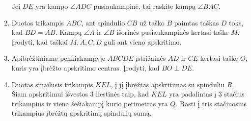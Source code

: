 \begin{enumerate}
  Jei $DE$ yra kampo $\angle ADC$ pusiaukampinė, tai raskite
  kampą $\angle BAC$. 
\item Duotas trikampis $ABC$, ant spindulio $CB$ už taško
  $B$ paimtas taškas $D$ toks, kad $BD=AB$. Kampų $\angle A$
  ir $\angle B$ išorinės pusiaukampinės kertasi taške $M$.
  Įrodyti, kad taškai $M,A,C,D$ guli ant vieno apskritimo.
\item Apibrėžtiniame penkiakampyje $ABCDE$ įstrižainės $AD$
  ir $CE$ kertasi taške $O$, kuris yra įbrėžto apskritimo
  centras. Įrodyti, kad $BO \perp{DE}$.
\item Duotas smailusis  trikampis $KEL$, į jį įbrėžtas
  apskritimas su spinduliu $R$. Šiam apskritimui išvestos 3
  liestinės taip, kad $KEL$ yra padalintas į 3 stačius
  trikampius ir viena šešiakampį kurio perimetras yra $Q$.
  Rasti į tris stačiuosius trikampius įbrėžtų apskritimų
  spindulių sumą. 

\end{enumerate}
